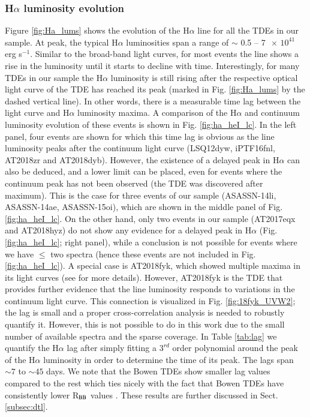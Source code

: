 \documentclass[structabstract]{aa}
\begin{document}
\subsubsection{H$\alpha$ luminosity evolution} \label{subsub:hale}
Figure \ref{fig:Ha_lums} shows the evolution of the H$\alpha$ line for all the TDEs in our sample. 
At peak, the typical H$\alpha$ luminosities span a range of $\sim$ 0.5 -- 7 $\,\times\,10^{41}$ erg s$^{-1}$. 
Similar to the broad-band light curves, for most events the line shows a rise in the luminosity  until it starts to decline with time. 
Interestingly, for many TDEs in our sample %
the H$\alpha$ luminosity is still rising after the respective optical light curve of the TDE has reached its peak (marked in Fig. \ref{fig:Ha_lums} by the dashed vertical line). In other words, there is a measurable time lag between the light curve and H$\alpha$ luminosity maxima. 
A comparison of the H$\alpha$ and continuum luminosity evolution of these events is shown in Fig. \ref{fig:ha_heI_lc}. In the left panel, four events are shown for which this time lag is obvious as the line luminosity peaks after the continuum light curve (LSQ12dyw, iPTF16fnl, AT2018zr and AT2018dyb). 
However, the existence of a delayed peak in H$\alpha$ can also be deduced, and a lower limit can be placed, even for events where the continuum peak has not been observed (the TDE was discovered after maximum). This is the case for three events of our sample (ASASSN-14li, ASASSN-14ae, ASASSN-15oi), which are shown in the middle panel of Fig. \ref{fig:ha_heI_lc}. On the other hand, only two events in our sample (AT2017eqx and AT2018hyz) do not show any evidence for a delayed peak in H$\alpha$ (Fig. \ref{fig:ha_heI_lc}; right panel), while a conclusion is not possible for events where we have $\leq$ two spectra (hence these events are not included in Fig. \ref{fig:ha_heI_lc}). A special case is AT2018fyk, which showed multiple maxima in its light curves (see \citealt{Wevers2019,Wevers2021} for more details).
However, AT2018fyk is the TDE that provides further evidence  that the line luminosity responds to variations in the continuum light curve.
This connection is visualized in Fig. \ref{fig:18fyk_UVW2}; the lag is small and a proper cross-correlation analysis is needed to robustly quantify it.
However, this is not possible to do in this work due to the small number of available spectra and the sparse coverage.
In Table \ref{tab:lag} we quantify the H$\alpha$ lag after simply fitting a $3^{rd}$ order polynomial around the peak of the H$\alpha$ luminosity in order to determine the time of its peak. The lags span $\sim7$ to $\sim45$ days. We note that the  Bowen TDEs show smaller lag values compared to the rest which ties nicely with the fact that  Bowen TDEs have consistently lower R$_{\rm BB}$ values \citep{vanvelzen2021}. These results are further discussed in Sect. \ref{subsec:dtl}.
\end{document}
